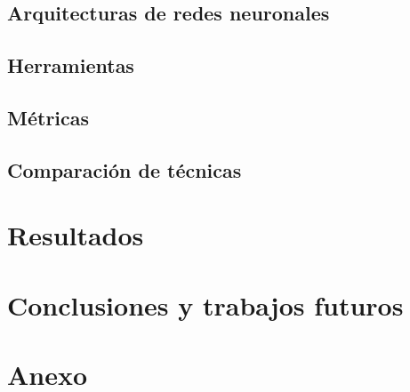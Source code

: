\documentclass[a4paper,12pt,spanish]{book}
\begin{document}
\section{Arquitecturas de redes neuronales}


\section{Herramientas}


\section{Métricas} \label{sec:metricas}


\section{Comparación de técnicas} \label{sec:comparacion}


\chapter{Resultados} \label{chap:resultados}










\chapter{Conclusiones y trabajos futuros}


\newpage
\footnotesize
\printbibliography[heading=bibintoc]

\appendix
\chapter*{Anexo}
\label{chap:anexo}


\newpage
\newpage
\vfill
\addtocounter{page}{-1}
\clearpage
\thispagestyle{empty}
\phantom{a}
\vfill
\newpage
\vfill
\addtocounter{page}{-1}
\end{document}
